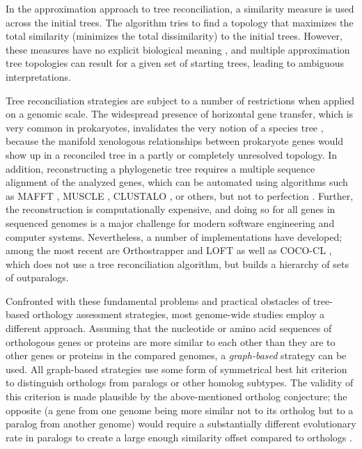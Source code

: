 

In the approximation approach to tree reconciliation, a similarity measure is
used across the initial trees. The algorithm tries to find a topology that
maximizes the total similarity (minimizes the total dissimilarity) to the
initial trees. However, these measures have no explicit biological meaning
\citep{mirkin1995}, and multiple approximation tree topologies can result for a
given set of starting trees, leading to ambiguous interpretations. 

Tree reconciliation strategies are subject to a number of restrictions when
applied on a genomic scale. The widespread presence of horizontal gene transfer,
which is very common in prokaryotes, invalidates the very notion of a species
tree \citep{doolittle2000}, because the manifold xenologous relationships
between prokaryote genes would show up in a reconciled tree in a partly or
completely unresolved topology.  In addition, reconstructing a phylogenetic tree
requires a multiple sequence alignment of the analyzed genes, which can be
automated using algorithms such as MAFFT \citep{katoh2005}, MUSCLE
\citep{edgar2004}, CLUSTALO \cite{sievers2011}, or others, but not to perfection
\citep{thompson2011}.  Further, the reconstruction is computationally expensive,
and doing so for all genes in sequenced genomes is a major challenge for modern
software engineering and computer systems. Nevertheless, a number of
implementations have developed; among the most recent are Orthostrapper
\citep{jothi2006} and LOFT \citep{van_der_heijden2007} as well as \mbox{COCO-CL}
\citep{storm2002}, which does not use a tree reconciliation algorithm, but
builds a hierarchy of sets of outparalogs. 

Confronted with these fundamental problems and practical obstacles of tree-based
orthology assessment strategies, most genome-wide studies employ a different
approach. Assuming that the nucleotide or amino acid sequences of orthologous
genes or proteins are more similar to each other than they are to other genes or
proteins in the compared genomes, a \emph{graph-based} strategy can be used. All
graph-based strategies use some form of symmetrical best hit criterion to
distinguish orthologs from paralogs or other homolog subtypes. The validity of
this criterion is made plausible by the above-mentioned ortholog conjecture; the
opposite (a gene from one genome being more similar not to its ortholog but to a
paralog from another genome) would require a substantially different
evolutionary rate in paralogs to create a large enough similarity offset
compared to orthologs \citep{koonin2005}.


